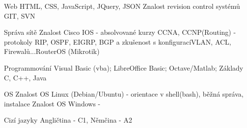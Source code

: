 

\begin{cvskills}

  
  \vspace{5pt}
  \cvskill
    {Web} %
    {HTML, CSS, JavaScript, JQuery, JSON \newline Znalost revision control systémů GIT, SVN}

  \vspace{5pt}
    
  \cvskill
    {Správa sítě} %
    {Znalost Cisco IOS - absolvované kurzy CCNA, CCNP(Routing) - protokoly RIP, OSPF, EIGRP, BGP a zkušenost s konfigurací\newline VLAN, ACL, Firewalů...\newline RouterOS (Mikrotik)} %
  \vspace{5pt}
  
  \cvskill
    {Programmování} %
    {Visual Basic (vba); LibreOffice Basic; Octave/Matlab; Základy C, C++, Java} %

  \vspace{5pt}
  \cvskill
    {OS}
    {Znalost OS Linux (Debian/Ubuntu) - orientace v shell(bash), běžná správa, instalace \newline Znalost OS Windows - }
  \vspace{5pt}
    
  \cvskill
    {Cizí jazyky} %
    {Angličtina - C1, Němčina - A2} %

\end{cvskills}
